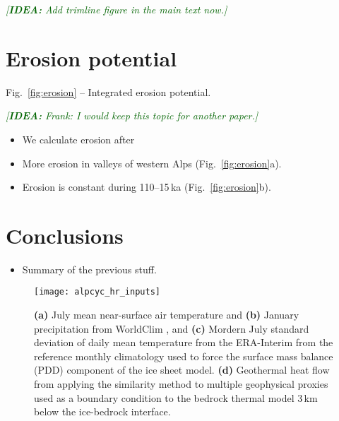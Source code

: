 \documentclass{article}
\newcommand{\idea}[1]{\textcolor{darkgreen}{\emph{[\textbf{IDEA:} #1]}}}
\begin{document}
    \idea{Add trimline figure in the main text now.}


\section{Erosion potential}

    Fig.~\ref{fig:erosion} -- Integrated erosion potential.

    \idea{Frank: I would keep this topic for another paper.}

    \begin{itemize}
    \item We calculate erosion after \citet{Herman.etal.2015}
    \item More erosion in valleys of western Alps (Fig.~\ref{fig:erosion}a).
    \item Erosion is constant during 110--15\,ka (Fig.~\ref{fig:erosion}b).
    \end{itemize}


\section{Conclusions}

    \begin{itemize}
    \item Summary of the previous stuff.
    \end{itemize}







\clearpage

    \begin{figure}
      \centerline{\texttt{[image: alpcyc\_hr\_inputs]}}
      \caption{%
        \textbf{(a)} July mean near-surface air temperature and
        \textbf{(b)} January precipitation from WorldClim
        \citep[1960--1990]{Hijmans.etal.2005}, and
        \textbf{(c)} Mordern July standard deviation of daily mean temperature
        from the ERA-Interim \citep[1979--2012]{Dee.etal.2011} from the
        reference monthly climatology used to force the surface mass balance
        (PDD) component of the ice sheet model.
        \textbf{(d)} Geothermal heat flow from applying the similarity method
        to multiple geophysical proxies \citep{Goutorbe.etal.2011} used as a
        boundary condition to the bedrock thermal model 3\,km below the
        ice-bedrock interface.}
      \label{fig:inputs}
    \end{figure}
\end{document}
